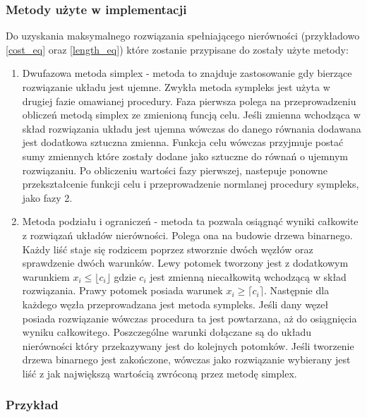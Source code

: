 \subsubsection{Metody użyte w implementacji}

Do uzyskania maksymalnego rozwiązania spełniającego nierówności (przykładowo \ref{cost_eq} oraz \ref{length_eq}) które zostanie przypisane do  zostały użyte metody:
\begin{enumerate}
  \item Dwufazowa metoda simplex - metoda to znajduje zastosowanie gdy bierzące rozwiązanie układu jest ujemne. Zwykła metoda sympleks jest użyta w drugiej fazie omawianej procedury. Faza pierwsza polega na przeprowadzeniu obliczeń metodą simplex ze zmienioną funcją celu. Jeśli zmienna wchodząca w skład rozwiązania układu jest ujemna wówczas do danego równania dodawana jest dodatkowa sztuczna zmienna. Funkcja celu wówczas przyjmuje postać sumy zmiennych które zostały dodane jako sztuczne do równań o ujemnym rozwiązaniu. Po obliczeniu wartości fazy pierwszej, nastepuje ponowne przekształcenie funkcji celu i przeprowadzenie normlanej procedury sympleks, jako fazy 2.
  \item Metoda podziału i ograniczeń - metoda ta pozwala osiągnąć wyniki całkowite z rozwiązań układów nierówności. Polega ona na budowie drzewa binarnego. Każdy liść staje się rodzicem poprzez stworznie dwóch węzłów oraz sprawdzenie dwóch warunków. Lewy potomek tworzony jest z dodatkowym warunkiem $x_i \le \lfloor c_i \rfloor$ gdzie $c_i$ jest zmienną niecałkowitą wchodzącą w skład rozwiązania. Prawy potomek posiada warunek $x_i \ge \lceil c_i \rceil$. Następnie dla każdego węzła przeprowadzana jest metoda sympleks. Jeśli dany węzeł posiada rozwiązanie wówczas procedura ta jest powtarzana, aż do osiągnięcia wyniku całkowitego. Poszczególne warunki dołączane są do układu nierówności który przekazywany jest do kolejnych potomków. Jeśli tworzenie drzewa binarnego jest zakończone, wówczas jako rozwiązanie wybierany jest liść z jak największą wartością zwróconą przez metodę simplex.
\end{enumerate}

\subsubsection{Przykład}

